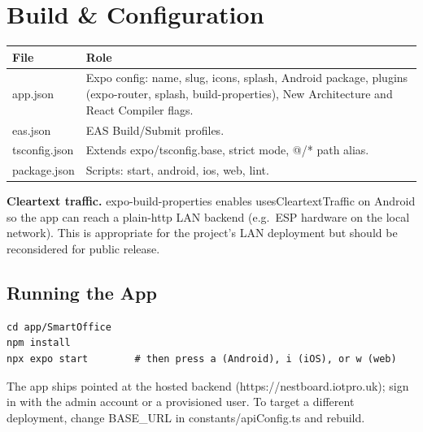 \documentclass[11pt,a4paper]{article}
\newcommand{\code}[1]{\colorbox{codebg}{\ttfamily\small #1}}
\begin{document}
\section{Build \& Configuration}

\begin{longtable}{@{}p{}p{}@{}}
  \toprule
  \textbf{File} & \textbf{Role} \\
  \midrule
  \endhead
  \code{app.json}      & Expo config: name, slug, icons, splash, Android package,
                         plugins (\code{expo-router}, splash, build-properties),
                         New Architecture and React Compiler flags. \\
  \code{eas.json}      & EAS Build/Submit profiles. \\
  \code{tsconfig.json} & Extends \code{expo/tsconfig.base}, strict mode, \code{@/*}
                         path alias. \\
  \code{package.json}  & Scripts: \code{start}, \code{android}, \code{ios},
                         \code{web}, \code{lint}. \\
  \bottomrule
\end{longtable}

\begin{notebox}
\textbf{Cleartext traffic.} \code{expo-build-properties} enables
\code{usesCleartextTraffic} on Android so the app can reach a plain-\code{http}
LAN backend (e.g.\ ESP hardware on the local network). This is appropriate for
the project's LAN deployment but should be reconsidered for public release.
\end{notebox}

\subsection{Running the App}

\begin{lstlisting}[language=tsx]
cd app/SmartOffice
npm install
npx expo start        # then press a (Android), i (iOS), or w (web)
\end{lstlisting}

The app ships pointed at the hosted backend
(\code{https://nestboard.iotpro.uk}); sign in with the admin account or a
provisioned user. To target a different deployment, change \code{BASE\_URL} in
\code{constants/apiConfig.ts} and rebuild.
\end{document}
